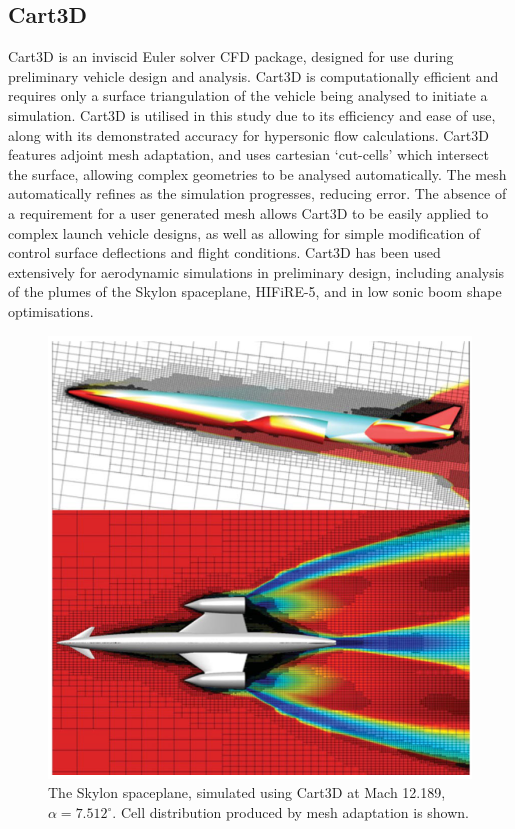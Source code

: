 \subsection{Cart3D}\label{sec:Cart3d}

Cart3D is an inviscid Euler solver CFD package, designed for use during preliminary vehicle design and analysis\cite{Almosnino2016}. Cart3D is computationally efficient and requires only a surface triangulation of the vehicle being analysed to initiate a simulation. Cart3D is utilised in this study due to its efficiency and ease of use, along with its demonstrated accuracy for hypersonic flow calculations\cite{Sagerman2017,Abeynayake,Aftosmis2011,Almosnino2016a}. Cart3D features adjoint mesh adaptation, and uses cartesian `cut-cells' which intersect the surface, allowing complex geometries to be analysed automatically. The mesh automatically refines as the simulation progresses, reducing error. The absence of a requirement for a user generated mesh allows Cart3D to be easily applied to complex launch vehicle designs, as well as allowing for simple modification of control surface deflections and flight conditions. 
Cart3D has been used extensively for aerodynamic simulations in preliminary design, including analysis of the plumes of the Skylon spaceplane\cite{Mehta2016}, HIFiRE-5\cite{Kimmel2010}, and in low sonic boom shape optimisations\cite{Aftosmis2011}. 
\begin{figure}[ht]
\centering
\includegraphics[width=0.6\linewidth]{figures/2_literature-review/Skylon-Cart3D}
\caption{The Skylon spaceplane, simulated using Cart3D at Mach 12.189, $\alpha=7.512^\circ$\cite{Mehta2016}. Cell distribution produced by mesh adaptation is shown.}
\label{fig:Skylon-Cart3D}
\end{figure}
